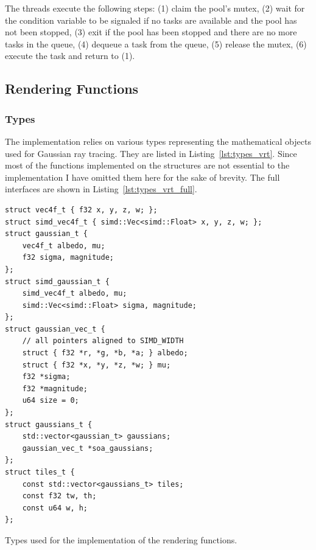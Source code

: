\documentclass[a4paper, 11pt]{memoir}
\begin{document}
    The threads execute the following steps: (1) claim the pool's mutex, (2) wait for the condition variable to be
    signaled if no tasks are available and the pool has not been stopped, (3) exit if the pool has been stopped and
    there are no more tasks in the queue, (4) dequeue a task from the queue, (5) release the mutex, (6) execute the task
    and return to (1).


    \subsection{Rendering Functions}
    \label{sec:rendering_functions}

    \subsubsection{Types}
    The implementation relies on various types representing the mathematical objects used for Gaussian ray tracing. They
    are listed in Listing~\ref{lst:types_vrt}. Since most of the functions implemented on the structures are not essential
    to the implementation I have omitted them here for the sake of brevity. The full interfaces are shown in Listing~\ref{lst:types_vrt_full}.
    \begin{listing}[t]
        \begin{verbatim}
struct vec4f_t { f32 x, y, z, w; };
struct simd_vec4f_t { simd::Vec<simd::Float> x, y, z, w; };
struct gaussian_t {
    vec4f_t albedo, mu;
    f32 sigma, magnitude;
};
struct simd_gaussian_t {
    simd_vec4f_t albedo, mu;
    simd::Vec<simd::Float> sigma, magnitude;
};
struct gaussian_vec_t {
    // all pointers aligned to SIMD_WIDTH
    struct { f32 *r, *g, *b, *a; } albedo;
    struct { f32 *x, *y, *z, *w; } mu;
    f32 *sigma;
    f32 *magnitude;
    u64 size = 0;
};
struct gaussians_t {
    std::vector<gaussian_t> gaussians;
    gaussian_vec_t *soa_gaussians;
};
struct tiles_t {
    const std::vector<gaussians_t> tiles;
    const f32 tw, th;
    const u64 w, h;
};
        \end{verbatim}
        \caption{Types used for the implementation of the rendering functions.}
        \label{lst:types_vrt}
    \end{listing}
\end{document}
